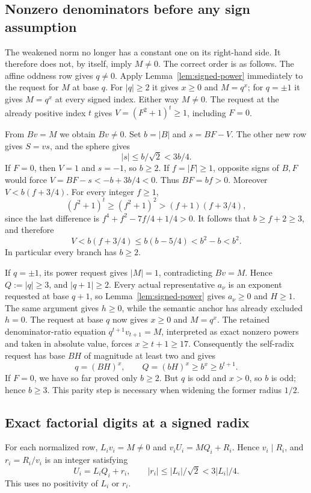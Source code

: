 \subsection{Nonzero denominators before any sign assumption}
The weakened norm no longer has a constant one on its right-hand side.
It therefore does not, by itself, imply $M\ne0$. The correct order is
as follows. The affine oddness row gives $q\ne0$. Apply
Lemma~\ref{lem:signed-power} immediately to the request for $M$ at base
$q$. For $|q|\ge2$ it gives $x\ge0$ and $M=q^x$; for $q=\pm1$
it gives $M=q^x$ at every signed index. Either way $M\ne0$.
The request at the already positive index $t$ gives
$V=(F^2+1)^t\ge1$, including $F=0$.

From $Bv=M$ we obtain $Bv\ne0$. Set $b=|B|$ and $s=BF-V$.
The other new row gives $S=vs$, and the sphere gives
\begin{equation}\label{eq:wide-near}
 |s|\le b/\sqrt2<3b/4.
\end{equation}
If $F=0$, then $V=1$ and $s=-1$, so $b\ge2$. If
$f=|F|\ge1$, opposite signs of $B,F$ would force
$V=BF-s<-b+3b/4<0$. Thus $BF=bf>0$. Moreover
$V<b(f+3/4)$. For every integer $f\ge1$,
\[
 (f^2+1)^t\ge(f^2+1)^2>(f+1)(f+3/4),
\]
since the last difference is $f^4+f^2-7f/4+1/4>0$.
It follows that $b\ge f+2\ge3$, and therefore
\begin{equation}\label{eq:early-wide}
 V<b(f+3/4)\le b(b-5/4)<b^2-b<b^2.
\end{equation}
In particular every branch has $b\ge2$.

If $q=\pm1$, its power request gives $|M|=1$, contradicting
$Bv=M$. Hence $Q:=|q|\ge3$, and $|q+1|\ge2$.
Every actual representative $a_\nu$ is an exponent requested at base
$q+1$, so Lemma~\ref{lem:signed-power} gives $a_\nu\ge0$ and
$H\ge1$. The same argument gives $h\ge0$, while the semantic anchor
has already excluded $h=0$. The request at base $q$ now gives
$x\ge0$ and $M=q^x$. The retained denominator-ratio equation
$q^{t+1}v_{t+1}=M$, interpreted as exact nonzero powers and taken in
absolute value, forces $x\ge t+1\ge17$. Consequently the self-radix
request has base $BH$ of magnitude at least two and gives
\begin{equation}\label{eq:wide-radix}
 q=(BH)^x,\qquad Q=(bH)^x\ge b^x\ge b^{t+1}.
\end{equation}
If $F=0$, we have so far proved only $b\ge2$. But $q$ is odd and
$x>0$, so $b$ is odd; hence $b\ge3$. This parity step is necessary
when widening the former radius $1/2$.

\subsection{Exact factorial digits at a signed radix}
For each normalized row, $L_i v_i=M\ne0$ and
$v_iU_i=MQ_i+R_i$. Hence $v_i\mid R_i$, and $r_i=R_i/v_i$ is
an integer satisfying
\begin{equation}\label{eq:wide-remainder}
 U_i=L_iQ_i+r_i,\qquad |r_i|\le |L_i|/\sqrt2<3|L_i|/4.
\end{equation}
This uses no positivity of $L_i$ or $r_i$.

